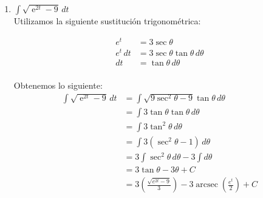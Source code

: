\documentclass[a4paper,10pt]{article}
\newcommand{\dis}{\displaystyle}
\def\e{\operatorname{e}}
\DeclareMathOperator{\arcsec}{arcsec}
\begin{document}
\begin{enumerate}
\begin{enumerate}[label=\emph{\alph*)}]
\newpage
\item $\dis \int \sqrt{\e^{2t}-9} \, dt$\\

Utilizamos la siguiente sustitución trigonométrica:\\

\begin{minipage}{.3\textwidth}
\raggedright
\begin{align*}
e^t  &= 3\sec \theta      \\
e^t \, dt &= 3 \sec \theta \tan \theta  \, d\theta  \\
 dt &=  \tan \theta  \, d\theta  \\
\end{align*}
\end{minipage}%
\begin{minipage}{.3\textwidth}
\raggedleft
{}
\end{minipage}

\dotfill [1 punto]

Obtenemos lo siguiente:
\begin{align*}
 \dis \int \sqrt{\e^{2t}-9} \, dt &=    \dis \int \sqrt{9 \sec^2 \theta - 9} \tan \theta\, d\theta\\
 									&=    \dis \int 3\tan \theta \tan \theta\, d\theta\\
                                    &=    \dis \int 3\tan^2 \theta \, d\theta\\
                                    &=    \dis \int 3(\sec^2 \theta-1)  \, d\theta\\
                                    &=    \dis 3\int \sec^2 \theta  \, d\theta - 3\int  d\theta\\
                                    &=    \dis 3 \tan \theta - 3\theta + C\\
                                    &=    \dis 3 (\frac{\sqrt{e^{2t}-9}}{3}) - 3\arcsec (\frac{e^t}{2}) + C\\
\end{align*}

\dotfill [1 punto]

\end{enumerate}


\end{enumerate}

\vspace{10mm}
\end{document}
